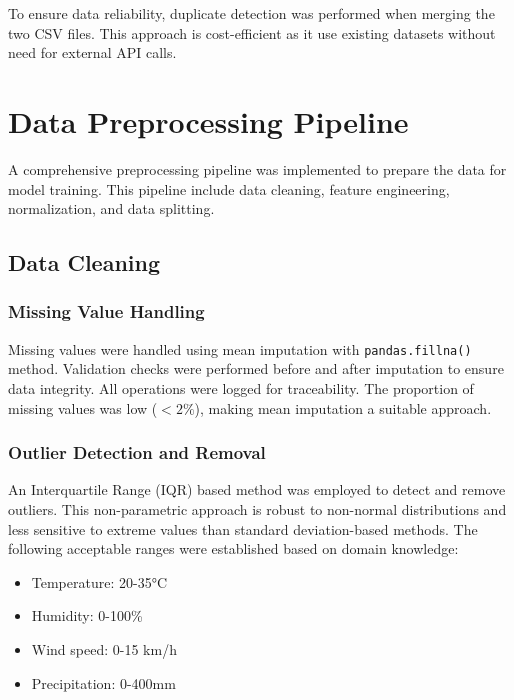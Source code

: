 \documentclass[12pt]{article}
\begin{document}
To ensure data reliability, duplicate detection was performed when merging the two CSV files. This approach is cost-efficient as it use existing datasets without need for external API calls.

\section{Data Preprocessing Pipeline}
\label{sec:data_preprocessing}

A comprehensive preprocessing pipeline was implemented to prepare the data for model training. This pipeline include data cleaning, feature engineering, normalization, and data splitting.

\subsection{Data Cleaning}
\label{subsec:data_cleaning}

\subsubsection{Missing Value Handling}
\label{subsubsec:missing_values}

Missing values were handled using mean imputation with \texttt{pandas.fillna()} method. Validation checks were performed before and after imputation to ensure data integrity. All operations were logged for traceability. The proportion of missing values was low ($<2\%$), making mean imputation a suitable approach.

\subsubsection{Outlier Detection and Removal}
\label{subsubsec:outlier_detection}

An Interquartile Range (IQR) based method was employed to detect and remove outliers. This non-parametric approach is robust to non-normal distributions and less sensitive to extreme values than standard deviation-based methods. The following acceptable ranges were established based on domain knowledge:

\begin{itemize}
    \item Temperature: 20-35°C
    \item Humidity: 0-100\%
    \item Wind speed: 0-15 km/h
    \item Precipitation: 0-400mm
\end{itemize}
\end{document}
